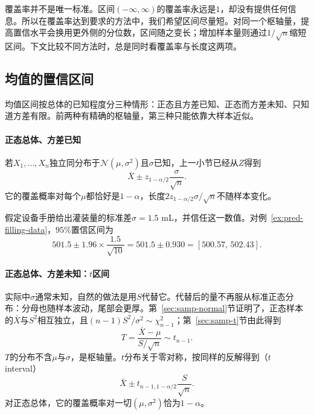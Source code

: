 覆盖率并不是唯一标准。区间$(-\infty,\infty)$的覆盖率永远是$1$，却没有提供任何信息。所以在覆盖率达到要求的方法中，我们希望区间尽量短。对同一个枢轴量，提高置信水平会换用更外侧的分位数，区间随之变长；增加样本量则通过$1/\sqrt n$缩短区间。下文比较不同方法时，总是同时看覆盖率与长度这两项。

\subsection{均值的置信区间}

均值区间按总体的已知程度分三种情形：正态且方差已知、正态而方差未知、只知道方差有限。前两种有精确的枢轴量，第三种只能依靠大样本近似。

\paragraph{正态总体、方差已知}

若$X_1,\dots,X_n$独立同分布于$\mathcal N(\mu,\sigma^2)$且$\sigma$已知，上一小节已经从$Z$得到
\begin{equation}
 \bar X\pm z_{1-\alpha/2}\frac{\sigma}{\sqrt n}.
 \label{eq:pred-z-interval}
\end{equation}
它的覆盖概率对每个$\mu$都恰好是$1-\alpha$，长度$2z_{1-\alpha/2}\sigma/\sqrt n$不随样本变化。

\begin{example}[方差已知时的灌装量区间]
\label{ex:pred-filling-z-interval}
假定设备手册给出灌装量的标准差$\sigma=1.5$ mL，并信任这一数值。对例~\ref{ex:pred-filling-data}，$95\%$置信区间为
\[
 501.5\pm1.96\times\frac{1.5}{\sqrt{10}}=501.5\pm0.930=[500.57,\,502.43].
\]
\end{example}

\paragraph{正态总体、方差未知：$t$区间}

实际中$\sigma$通常未知，自然的做法是用$S$代替它。代替后的量不再服从标准正态分布：分母也随样本波动，尾部会更厚。第~\ref{sec:samp-normal}节证明了，正态样本的$\bar X$与$S^2$相互独立，且$(n-1)S^2/\sigma^2\sim\chi^2_{n-1}$；第~\ref{sec:samp-t}节由此得到
\begin{equation}
 T=\frac{\bar X-\mu}{S/\sqrt n}\sim t_{n-1}.
 \label{eq:pred-t-pivot}
\end{equation}
$T$的分布不含$\mu$与$\sigma$，是枢轴量。$t$分布关于零对称，按同样的反解得到（$t$ interval）
\begin{equation}
 \bar X\pm t_{n-1,1-\alpha/2}\frac{S}{\sqrt n}.
 \label{eq:pred-t-interval}
\end{equation}
对正态总体，它的覆盖概率对一切$(\mu,\sigma^2)$恰为$1-\alpha$。

